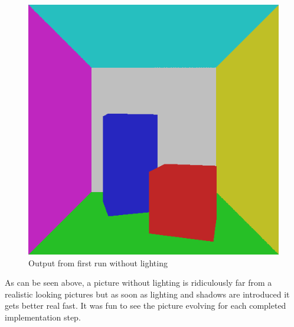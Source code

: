 \documentclass[a4paper,11pt]{article}
\begin{document}
\begin{figure}[h!]
	\centering	
	\includegraphics[width=0.45\linewidth]{screenshot1.png}
	\caption{Output from first run without lighting}
	\label{fig1}
\end{figure}

As can be seen above, a picture without lighting is ridiculously far from a realistic looking pictures but as soon as lighting and shadows are introduced it gets better real fast. It was fun to see the picture evolving for each completed implementation step. 
\end{document}
